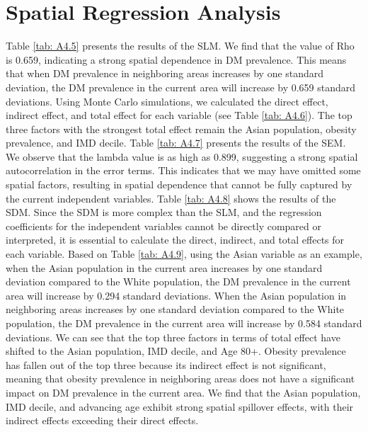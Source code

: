 \section{Spatial Regression Analysis}
\label{chap:4.4}
Table \ref{tab: A4.5} presents the results of the SLM. We find that the value of Rho is 0.659, indicating a strong spatial dependence in DM prevalence. This means that when DM prevalence in neighboring areas increases by one standard deviation, the DM prevalence in the current area will increase by 0.659 standard deviations. Using Monte Carlo simulations, we calculated the direct effect, indirect effect, and total effect for each variable (see Table \ref{tab: A4.6}). The top three factors with the strongest total effect remain the Asian population, obesity prevalence, and IMD decile. Table \ref{tab: A4.7} presents the results of the SEM. We observe that the lambda value is as high as 0.899, suggesting a strong spatial autocorrelation in the error terms. This indicates that we may have omitted some spatial factors, resulting in spatial dependence that cannot be fully captured by the current independent variables.
Table \ref{tab: A4.8} shows the results of the SDM. Since the SDM is more complex than the SLM, and the regression coefficients for the independent variables cannot be directly compared or interpreted, it is essential to calculate the direct, indirect, and total effects for each variable. Based on Table \ref{tab: A4.9}, using the Asian variable as an example, when the Asian population in the current area increases by one standard deviation compared to the White population, the DM prevalence in the current area will increase by 0.294 standard deviations. When the Asian population in neighboring areas increases by one standard deviation compared to the White population, the DM prevalence in the current area will increase by 0.584 standard deviations. We can see that the top three factors in terms of total effect have shifted to the Asian population, IMD decile, and Age 80+. Obesity prevalence has fallen out of the top three because its indirect effect is not significant, meaning that obesity prevalence in neighboring areas does not have a significant impact on DM prevalence in the current area. We find that the Asian population, IMD decile, and advancing age exhibit strong spatial spillover effects, with their indirect effects exceeding their direct effects.

